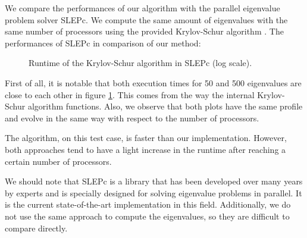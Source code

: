We compare the performances of our algorithm with the parallel eigenvalue problem solver SLEPc.
We compute the same amount of eigenvalues with the same number of processors using the provided Krylov-Schur algorithm \cite{stewart_krylovschur_2002}.
The performances of SLEPc in comparison of our method:

\begin{figure}[H]
 \centering
 
 \caption{Runtime of the Krylov-Schur algorithm in SLEPc (log scale).}
 \label{fig:slepc}
\end{figure}

First of all, it is notable that both execution times for 50 and 500 eigenvalues are close to each other in figure \ref{fig:slepc}.
This comes from the way the internal Krylov-Schur algorithm functions.
Also, we observe that both plots have the same profile and evolve in the same way with respect to the number of processors.

The algorithm, on this test case, is faster than our implementation.
However, both approaches tend to have a light increase in the runtime after reaching a certain number of processors.

We should note that SLEPc is a library that has been developed over many years by experts and is specially designed for solving eigenvalue problems in parallel.
It is the current state-of-the-art implementation in this field.
Additionally, we do not use the same approach to compute the eigenvalues, so they are difficult to compare directly.

